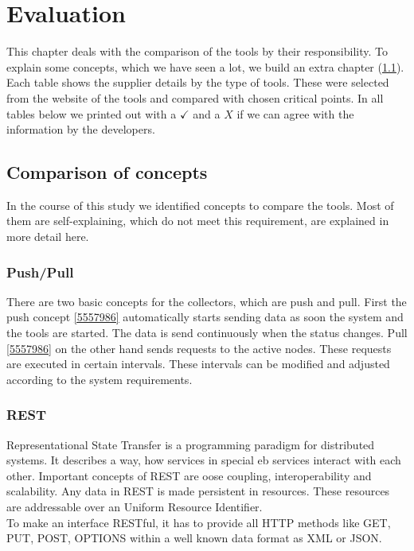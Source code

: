 \chapter{Evaluation} %
This chapter deals with the comparison of the tools by their responsibility. To explain some concepts, which we have seen a lot, we build an extra chapter (\cref{concepts}).
Each table shows the supplier details by the type of tools. These were selected from the website of the tools and compared with chosen critical points.
In all tables below we printed out with a $ \checkmark $ and a $ X $ if we can agree with the information by the developers.


\section{Comparison of concepts}
\label{concepts}
In the course of this study we identified concepts to compare the tools. Most of them are self-explaining, which do not meet this requirement, are explained in more detail here.
\subsection{Push/Pull}
\label{push/pull}
There are two basic concepts for the collectors, which are push and pull. First the push concept \cref{5557986} automatically starts sending data as soon the system and the tools are started. The data is send continuously when the status changes.
Pull \cref{5557986} on the other hand sends requests to the active nodes. These requests are executed in certain intervals. These intervals can be modified and adjusted according to the system requirements.
\subsection{REST}
\label{rest}
Representational State Transfer is a programming paradigm for distributed systems. It describes a way, how services in special eb services interact with each other. Important concepts of REST are oose coupling, interoperability and scalability. Any data in REST is made persistent in resources. These resources are addressable over an Uniform Resource Identifier. \\
To make an interface RESTful, it has to provide all HTTP methods like GET, PUT, POST, OPTIONS within a well known data format as XML or JSON.


